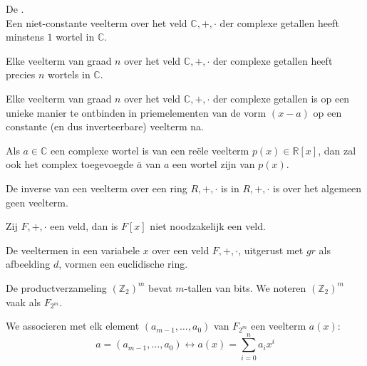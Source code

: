 \documentclass[main.tex]{subfiles}
\begin{document}
\begin{st}
  \label{st:fundamentele-stelling-van-de-algebra}
  De .\\
  Een niet-constante veelterm over het veld $\mathbb{C},+,\cdot$ der complexe getallen heeft minstens $1$ wortel in $\mathbb{C}$.
\end{st}
  
\begin{gev}
  Elke veelterm van graad $n$ over het veld $\mathbb{C},+,\cdot$ der complexe getallen heeft precies $n$ wortels in $\mathbb{C}$.
\end{gev}

\begin{gev}
  Elke veelterm van graad $n$ over het veld $\mathbb{C},+,\cdot$ der complexe getallen is op een unieke manier te ontbinden in priemelementen van de vorm $(x-a)$ op een constante (en dus inverteerbare) veelterm na.
\end{gev}

\begin{st}
  Als $a\in \mathbb{C}$ een complexe wortel is van een re\"ele veelterm $p(x)\in \mathbb{R}[x]$, dan zal ook het complex toegevoegde $\bar{a}$ van $a$ een wortel zijn van $p(x)$.
\end{st}

\begin{opm}
  De inverse van een veelterm over een ring $R,+,\cdot$ is in $R,+,\cdot$ is over het algemeen geen veelterm.
\end{opm}

\begin{opm}
  Zij $F,+,\cdot$ een veld, dan is $F[x]$ niet noodzakelijk een veld.
\end{opm}

\begin{st}
  De veeltermen in een variabele $x$ over een veld $F,+,\cdot$, uitgerust met $gr$ als afbeelding $d$, vormen een euclidische ring.
\end{st}

\begin{de}
  De productverzameling $(\mathbb{Z}_{2})^{m}$ bevat $m$-tallen van bits.
  We noteren $(\mathbb{Z}_{2})^{m}$ vaak als $F_{2^{m}}$.
\end{de}

\begin{de}
  We associeren met elk element $(a_{m-1},\dotsc,a_{0})$ van $F_{2^{m}}$ een veelterm $a(x)$:
  \[ a = (a_{m-1},\dotsc,a_{0}) \longleftrightarrow a(x) = \sum_{i=0}^{n}a_{i}x^{i} \]
\end{de}
\end{document}
